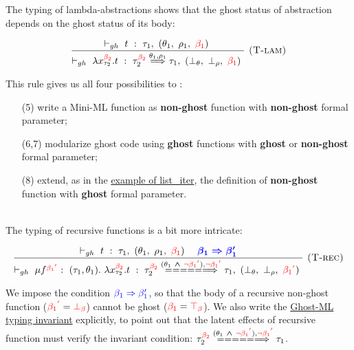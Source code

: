 \documentclass[a4paper,11pt,oneside]{article}
\theoremstyle{plain}
\newcommand{\rouge}[1]{\textcolor{red}{#1}}
\newcommand{\bwedge}{\boldsymbol{~\wedge~}}
\newcommand{\ghosttyping}[6]{\vdash_{gh}~#1~:~#2,~(#3,~#4,~\rouge{#5})~\textcolor{blue}{\boldsymbol{#6}}}
\newcommand{\bth}{\bot_\theta}
\newcommand{\brh}{\bot_\rho}
\newcommand{\gba}[1]{\beta_{#1}}
\newcommand{\gbb}{\bot_\beta}
\newcommand{\gbt}{\top_\beta}
\newcommand{\gbra}[1]{\textcolor{red}{\gba{#1}}}
\newcommand{\gbbr}{\textcolor{red}{\gbb}}
\newcommand{\gbtr}{\textcolor{red}{\gbt}}
\newcommand{\gbran}[1]{\textcolor{red}{\neg\gba{#1}}}
\begin{document}
The typing of lambda-abstractions shows that the ghost status of abstraction depends on the ghost status of its body:
\begin{footnotesize}	
\begin{displaymath}
\begin{array}{l}
\dfrac
	{\ghosttyping
		{t}
		{\tau_1}
		{\theta_1}
		{\rho_1}
		{\gbra{1}}
		{}}
	{\ghosttyping
		{\lambda x^{\gbra{2}}_{\tau_2} . t}
		{\tau_{2}^{\gbra{2}} \stackrel{\theta_1, \rho_1}{\Longrightarrow} \tau_1}
		{\bth}
		{\brh}
		{\gbra{1}}
		{}}
	{\textsc{  (T-lam)}}
\end{array}	
\end{displaymath}
\end{footnotesize}	
This rule gives us all four possibilities to :
\begin{itemize}
\item[(5)] write a Mini-ML function as \textbf{non-ghost} function with \textbf{non-ghost} formal parameter; 

\item[(6,7)] modularize ghost code using \textbf{ghost} functions with \textbf{ghost} or \textbf{non-ghost} formal parameter; 

\item[(8)] extend, as in the \hyperlink{list-iter}{example of list\_iter}, the definition of \textbf{non-ghost} function with \textbf{ghost} formal parameter.
\end{itemize}
~\\
The typing of recursive functions is a bit more intricate:
\begin{footnotesize}	
\begin{displaymath}
\begin{array}{l}
\dfrac
	{\ghosttyping
		{t}
		{\tau_1}
		{\theta_1}
		{\rho_1}
		{\gbra{1}}
		{\quad \gba{1} \Rightarrow \beta_1'}}
	{\ghosttyping
		{\mu f^{\gbra{1}^{\rouge{'}}}:~(\tau_1, \theta_1).~\lambda x^{\gbra{2}}_{\tau_2}. t} 
		{\tau_{2}^{\gbra{2}} \stackrel{(\theta_1 \bwedge \gbran{1}^{\rouge{'}}), \gbran{1}^{\rouge{'}}}{=======>} \tau_1}
		{\bth}
		{\brh}
		{\gbra{1}^{\rouge{'}}}
		{}}
	{\textsc{  (T-rec)}}
\end{array}	
\end{displaymath}
\end{footnotesize}
We impose the condition $\textcolor{blue}{\gba{1} \Rightarrow
  \beta_1'}$, so that the body of a recursive non-ghost function ($\gbra{1}^{\rouge{'}} = \gbbr$) cannot be ghost ($\gbra{1} = \gbtr$).   
We also write the \hyperlink{gh-typ-inv}{Ghost-ML typing invariant} explicitly, to point out that the latent effects of recursive function must verify the invariant condition:
${\tau_{2}^{\gbra{2}} \stackrel{(\theta_1 \bwedge \gbran{1}^{\rouge{'}}), \gbran{1}^{\rouge{'}}}{=======>} \tau_1}$.
\end{document}
